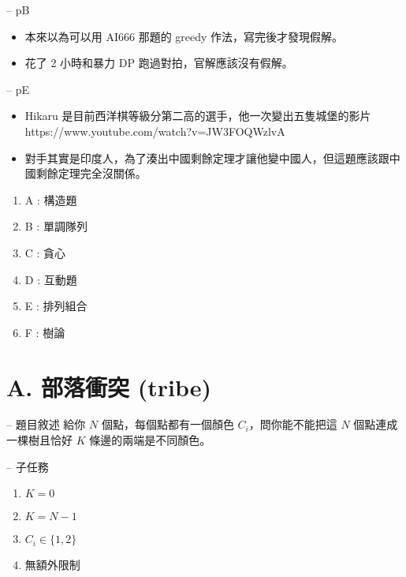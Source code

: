 \documentclass[hyperref,UTF8,notheorems,xcolor={dvipsnames}]{beamer}
\newcommand{\btitle}[1]{{\secname} -- #1}
\theoremstyle{definition}
\begin{document}
\begin{frame}[fragile]{\btitle{pB}}
	\begin{itemize}
		\item 本來以為可以用 AI666 那題的 greedy 作法，寫完後才發現假解。
		\pause
		\item 花了 2 小時和暴力 DP 跑過對拍，官解應該沒有假解。
	\end{itemize}
\end{frame}

\begin{frame}[fragile]{\btitle{pE}}
	\begin{itemize}
		\item Hikaru 是目前西洋棋等級分第二高的選手，他一次變出五隻城堡的影片 https://www.youtube.com/watch?v=JW3FOQWzlvA
		\item 對手其實是印度人，為了湊出中國剩餘定理才讓他變中國人，但這題應該跟中國剩餘定理完全沒關係。

	\end{itemize}
\end{frame}


\begin{frame}[fragile]{\secname}
	\begin{enumerate}
		\item A : 構造題
		\item B : 單調隊列
		\item C : 貪心
		\item D : 互動題
		\item E : 排列組合
		\item F : 樹論
	\end{enumerate}
\end{frame}

\section{A. 部落衝突 (tribe)}


\begin{frame}[fragile]{\btitle{題目敘述}}
	給你 $N$ 個點，每個點都有一個顏色 $C_i$，問你能不能把這 $N$ 個點連成一棵樹且恰好 $K$ 條邊的兩端是不同顏色。
\end{frame}

\begin{frame}[fragile]{\btitle{子任務}}
	\begin{enumerate}
		\item $K = 0$
		\item $K = N - 1$
		\item $C_i \in \{1, 2\}$
		\item 無額外限制
	\end{enumerate}
\end{frame}
\end{document}
